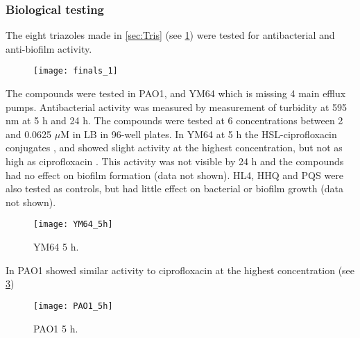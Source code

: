 \subsubsection{Biological testing\label{sec:bio1}}

The eight triazoles made in \ref{sec:Tris} (see \ref{fgr:finals_1}) were tested for antibacterial and anti-biofilm activity. 

\begin{figure}[H]
	\begin{center}
		\texttt{[image: finals\_1]}
		\caption{
 		\label{fgr:finals_1}}
	\end{center}
\end{figure}

The compounds were tested in PAO1, and YM64 which is missing 4 main efflux pumps.
Antibacterial activity was measured by measurement of turbidity at 595 nm at 5 h and 24 h.
The compounds were tested at 6 concentrations between 2 and 0.0625 $\mu$M in LB in 96-well plates.
In YM64 at 5 h the HSL-ciprofloxacin conjugates ,  and  showed slight activity at the highest concentration, but not as high as ciprofloxacin .
This activity was not visible by 24 h and the compounds had no effect on biofilm formation (data not shown).
HL4, HHQ and PQS were also tested as controls, but had little effect on bacterial or biofilm growth (data not shown).

\begin{figure}[H]
	\begin{center}
		\texttt{[image: YM64\_5h]}
		\caption{YM64 5 h.\label{fgr:YM64_5h}}
	\end{center}
\end{figure}

In PAO1  showed similar activity to ciprofloxacin  at the highest concentration (see \ref{fgr:PAO1_5h})

\begin{figure}[H]
	\begin{center}
		\texttt{[image: PAO1\_5h]}
		\caption{PAO1 5 h.\label{fgr:PAO1_5h}}
	\end{center}
\end{figure}


